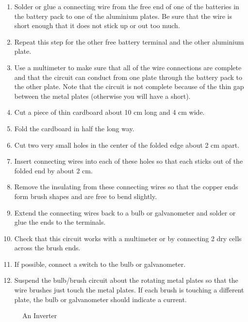 \begin{enumerate}
\item{Solder or glue a connecting wire from the free end of one of the batteries in the battery pack to one of the aluminium plates. Be sure that the wire is short enough that it does not stick up or out too much.} 
\item{Repeat this step for the other free battery terminal and the other aluminium plate.} 
\item{Use a multimeter to make sure that all of the wire connections are complete and that the circuit can conduct from one plate through the battery pack to the other plate. Note that the circuit is not complete because of the thin gap between the metal plates (otherwise you will have a short).} 
\item{Cut a piece of thin cardboard about 10 cm long and 4 cm wide.} 
\item{Fold the cardboard in half the long way.} 
\item{Cut two very small holes in the center of the folded edge about 2 cm apart.} 
\item{Insert connecting wires into each of these holes so that each sticks out of the folded end by about 2 cm.} 
\item{Remove the insulating from these connecting wires so that the copper ends form brush shapes and are free to bend slightly.} 
\item{Extend the connecting wires back to a bulb or galvanometer and solder or glue the ends to the terminals.} 
\item{Check that this circuit works with a multimeter or by connecting 2 dry cells across the brush ends.} 
\item{If possible, connect a switch to the bulb or galvanometer.} 
\item{Suspend the bulb/brush circuit about the rotating metal plates so that the wire brushes just touch the metal plates. If each brush is touching a different plate, the bulb or galvanometer should indicate a current.} 
\end{enumerate}

\begin{figure}
\begin{center}
\def\svgwidth{400pt}

\caption{An Inverter}
\label{fig:inverter}
\end{center}
\end{figure}


